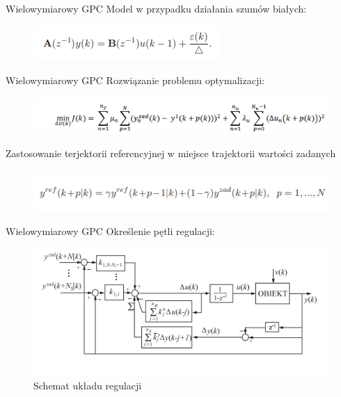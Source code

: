 \begin{frame}{Wielowymiarowy GPC}
Model w przypadku działania szumów białych:
	\begin{center}
		\begin{figure}[H]
            		\includegraphics[scale=0.9]{images/postac_GPC.png}
		\end{figure}
	\end{center}
\end{frame}

\begin{frame}{Wielowymiarowy GPC}
Rozwiązanie problemu optymalizacji:
	\begin{center}
		\begin{figure}[H]
            		\includegraphics[scale=0.6]{images/cel_DMC.png}
		\end{figure}
	\end{center}
Zastosowanie terjektorii referencyjnej w miejsce trajektorii wartości zadanych
	\begin{center}
		\begin{figure}[H]
            		\includegraphics[scale=0.65]{images/referencyjna_GPC.png}
		\end{figure}
	\end{center}
\end{frame}


\begin{frame}{Wielowymiarowy GPC}
Określenie pętli regulacji:
	\begin{center}
		\begin{figure}[H]
            		\includegraphics[scale=0.7]{images/SISOGPC.png}
          			 \caption{Schemat układu regulacji}
		\end{figure}
	\end{center}
\end{frame}

